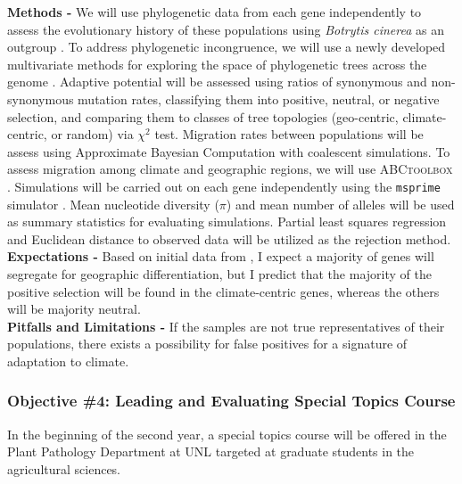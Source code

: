 \documentclass[12pt,letterpaper]{article}
\begin{document}
\noindent \textbf{Methods -} 
We will use phylogenetic data from each gene independently to assess the evolutionary history of these populations using \textit{Botrytis cinerea} as an outgroup \citep{staats2012genome}. 
To address phylogenetic incongruence, we will use a newly developed multivariate methods for exploring the space of phylogenetic trees across the genome \citep{kendall2016mapping, jombart2017treespace}. 
Adaptive potential will be assessed using ratios of synonymous and non-synonymous mutation rates, classifying them into positive, neutral, or negative selection, and comparing them to classes of tree topologies (geo-centric, climate-centric, or random) via $\chi^2$ test.
Migration rates between populations will be assess using Approximate Bayesian Computation with coalescent simulations. 
To assess migration among climate and geographic regions, we will use \textsc{ABCtoolbox} \citep{wegmann2010abctoolbox}. 
Simulations will be carried out on each gene independently using the \texttt{msprime} simulator \citep{kelleher2016efficient}. 
Mean nucleotide diversity ($\pi$) and mean number of alleles will be used as summary statistics for evaluating simulations. 
Partial least squares regression and Euclidean distance to observed data will be utilized as the rejection method.\\
\noindent \textbf{Expectations -}
Based on initial data from \citet{attanayake2013sclerotinia}, I expect a majority of genes will segregate for geographic differentiation, but I predict that the majority of the positive selection will be found in the climate-centric genes, whereas the others will be majority neutral.\\
\noindent \textbf{Pitfalls and Limitations -}
If the samples are not true representatives of their populations, there exists a possibility for false positives for a signature of adaptation to climate.

\subsubsection{Objective \#4: Leading and Evaluating Special Topics Course}

In the beginning of the second year, a special topics course will be offered in the Plant Pathology Department at UNL targeted at graduate students in the agricultural sciences.
\end{document}
